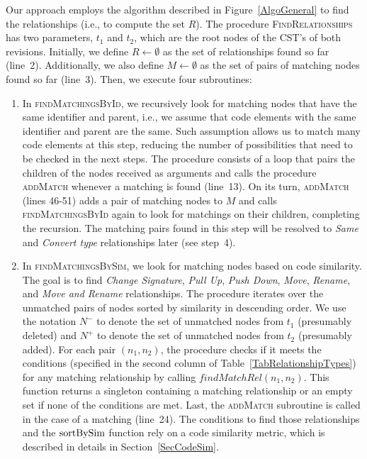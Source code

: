 Our approach employs the algorithm described in Figure~\ref{AlgoGeneral} to find the relationships (i.e., to compute the set $R$).
The procedure \textsc{FindRelationships} has two parameters, $t_1$ and $t_2$, which are the root nodes of the CST's of both revisions.
Initially, we define $R \gets \emptyset$ as the set of relationships found so far (line~2).
Additionally, we also define $M \gets \emptyset$ as the set of pairs of matching nodes found so far (line~3).
Then, we execute four subroutines:
\begin{enumerate}

\item In \textsc{findMatchingsById}, we recursively look for matching nodes that have the same identifier and parent, i.e., we assume that code elements with the same identifier and parent are the same.
Such assumption allows us to match many code elements at this step, reducing the number of possibilities that need to be checked in the next steps.
The procedure consists of a loop that pairs the children of the nodes received as arguments and calls the procedure \textsc{addMatch} whenever a matching is found (line~13).
On its turn, \textsc{addMatch} (lines 46-51) adds a pair of matching nodes to $M$ and calls \textsc{findMatchingsById} again to look for matchings on their children, completing the recursion.
The matching pairs found in this step will be resolved to \textit{Same} and \textit{Convert type} relationships later (see step~4).

\item In \textsc{findMatchingsBySim}, we look for matching nodes based on code similarity.
The goal is to find \textit{Change Signature}, \textit{Pull Up}, \textit{Push Down}, \textit{Move}, \textit{Rename}, and \textit{Move and Rename} relationships.
The procedure iterates over the unmatched pairs of nodes sorted by similarity in descending order.
We use the notation $N^-$ to denote the set of unmatched nodes from $t_1$ (presumably deleted) and $N^+$ to denote the set of unmatched nodes from $t_2$ (presumably added).
For each pair $(n_1, n_2)$, the procedure checks if it meets the conditions (specified in the second column of Table~\ref{TabRelationshipTypes}) for any matching relationship by calling $\mathit{findMatchRel}(n_1, n_2)$.
This function returns a singleton containing a matching relationship or an empty set if none of the conditions are met.
Last, the \textsc{addMatch} subroutine is called in the case of a matching (line~24).
The conditions to find those relationships and the $\operatorname{sortBySim}$ function rely on a code similarity metric, which is described in details in Section~\ref{SecCodeSim}.


\end{enumerate}
